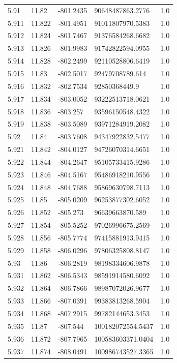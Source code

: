 \begin{tabular}{lllll}
5.91 & 11.82 & -801.2435 & 90648487863.2776 & 1.0 \\
5.911 & 11.822 & -801.4951 & 91011807970.5383 & 1.0 \\
5.912 & 11.824 & -801.7467 & 91376584268.6682 & 1.0 \\
5.913 & 11.826 & -801.9983 & 91742822594.0955 & 1.0 \\
5.914 & 11.828 & -802.2499 & 92110528806.6419 & 1.0 \\
5.915 & 11.83 & -802.5017 & 92479708789.614 & 1.0 \\
5.916 & 11.832 & -802.7534 & 92850368449.9 & 1.0 \\
5.917 & 11.834 & -803.0052 & 93222513718.0621 & 1.0 \\
5.918 & 11.836 & -803.257 & 93596150548.4322 & 1.0 \\
5.919 & 11.838 & -803.5089 & 93971284919.2082 & 1.0 \\
5.92 & 11.84 & -803.7608 & 94347922832.5477 & 1.0 \\
5.921 & 11.842 & -804.0127 & 94726070314.6651 & 1.0 \\
5.922 & 11.844 & -804.2647 & 95105733415.9286 & 1.0 \\
5.923 & 11.846 & -804.5167 & 95486918210.9556 & 1.0 \\
5.924 & 11.848 & -804.7688 & 95869630798.7113 & 1.0 \\
5.925 & 11.85 & -805.0209 & 96253877302.6052 & 1.0 \\
5.926 & 11.852 & -805.273 & 96639663870.589 & 1.0 \\
5.927 & 11.854 & -805.5252 & 97026996675.2569 & 1.0 \\
5.928 & 11.856 & -805.7774 & 97415881913.9415 & 1.0 \\
5.929 & 11.858 & -806.0296 & 97806325808.8147 & 1.0 \\
5.93 & 11.86 & -806.2819 & 98198334606.9878 & 1.0 \\
5.931 & 11.862 & -806.5343 & 98591914580.6092 & 1.0 \\
5.932 & 11.864 & -806.7866 & 98987072026.9677 & 1.0 \\
5.933 & 11.866 & -807.0391 & 99383813268.5904 & 1.0 \\
5.934 & 11.868 & -807.2915 & 99782144653.3453 & 1.0 \\
5.935 & 11.87 & -807.544 & 100182072554.5437 & 1.0 \\
5.936 & 11.872 & -807.7965 & 100583603371.0404 & 1.0 \\
5.937 & 11.874 & -808.0491 & 100986743527.3365 & 1.0 \\

\end{tabular}
